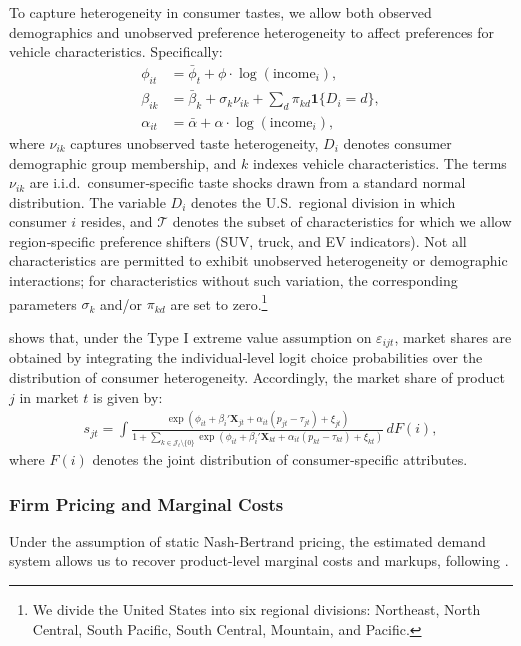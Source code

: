 \documentclass[11pt]{article}
\begin{document}
To capture heterogeneity in consumer tastes, we allow both observed demographics and unobserved preference heterogeneity to affect preferences for vehicle characteristics. Specifically:
\begin{align}
    \phi_{it} &= \bar{\phi}_t + \phi \cdot \log(\text{income}_i), \\
    \beta_{ik} &= \bar{\beta}_k + \sigma_k \nu_{ik} + \sum_d \pi_{kd} \mathbf{1}\{D_i = d\}, \\
    \alpha_{it} &= \bar{\alpha} + \alpha \cdot \log(\text{income}_i),
\end{align}
where \(\nu_{ik}\) captures unobserved taste heterogeneity, \(D_i\) denotes consumer demographic group membership, and \(k\) indexes vehicle characteristics. The terms \(\nu_{ik}\) are i.i.d.\ consumer‑specific taste shocks drawn from a standard normal distribution. The variable \(D_i\) denotes the U.S.\ regional division in which consumer \(i\) resides, and \(\mathcal{T}\) denotes the subset of characteristics for which we allow region‑specific preference shifters (SUV, truck, and EV indicators). Not all characteristics are permitted to exhibit unobserved heterogeneity or demographic interactions; for characteristics without such variation, the corresponding parameters \(\sigma_k\) and/or \(\pi_{kd}\) are set to zero.\footnote{We divide the United States into six regional divisions: Northeast, North Central, South Pacific, South Central, Mountain, and Pacific.}

\cite{berry_automobile_1995} shows that, under the Type I extreme value assumption on \(\varepsilon_{ijt}\), market shares are obtained by integrating the individual‑level logit choice probabilities over the distribution of consumer heterogeneity. Accordingly, the market share of product \(j\) in market \(t\) is given by:
\begin{align}\label{eq:blpshares}
    s_{jt} = \int
    \frac{\exp\!\left(\phi_{it} + \beta_{i}'\mathbf{X}_{jt} + \alpha_{it}(p_{jt} - \tau_{jt}) + \xi_{jt}\right)}
    {1 + \sum_{k \in \mathcal{J}_t \setminus \{0\}}
    \exp\!\left(\phi_{it} + \beta_{i}'\mathbf{X}_{kt} + \alpha_{it}(p_{kt} - \tau_{kt}) + \xi_{kt}\right)}
    \, dF(i),
\end{align}
\noindent where \(F(i)\) denotes the joint distribution of consumer‑specific attributes.

\subsubsection{Firm Pricing and Marginal Costs}
Under the assumption of static Nash-Bertrand pricing, the estimated demand system allows us to recover product-level marginal costs and markups, following \cite{berry_automobile_1995}.
\end{document}
